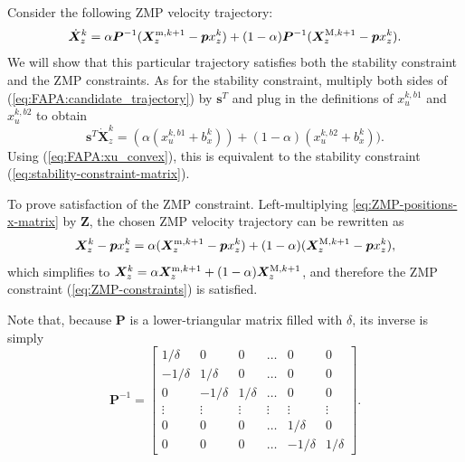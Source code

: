Consider the following ZMP velocity trajectory:
\begin{equation}\label{eq:FAPA:candidate_trajectory}
\dot{\bm{X}}_z^k = \alpha \bm{P}^{-1}(\bm{X}_z^{{\rm m}, k+1} - \bm{p} x_z^k) + (1-\alpha)\bm{P}^{-1}(\bm{X}_z^{{\rm M}, k+1} - \bm{p} x_z^k).
\end{equation}
We will show that this particular trajectory satisfies both the stability
constraint and the ZMP constraints. As for the stability constraint, multiply
both sides of (\ref{eq:FAPA:candidate_trajectory}) by $\bm{s}^T$
and plug in the definitions of $x_u^{k,b1}$ and $x_u^{k,b2}$ to obtain
\begin{equation*}
\bm{s}^T\dot{\bm X}_z^k = (\alpha (x_u^{k,b1} + b^k_x)) + (1-\alpha)(x_u^{k,b2} + b^k_x)).
\end{equation*}
Using (\ref{eq:FAPA:xu_convex}), this is equivalent to the stability
constraint (\ref{eq:stability-constraint-matrix}).

To prove satisfaction of the ZMP constraint. Left-multiplying
\eqref{eq:ZMP-positions-x-matrix} by $\bm{Z}$, the chosen ZMP velocity
trajectory can be rewritten as
\begin{equation*}
\bm{X}_z^k - \bm{p} x_z^k = \alpha (\bm{X}_z^{{\rm m}, k+1} - \bm{p} x_z^k) + (1-\alpha)(\bm{X}_z^{{\rm M}, k+1} - \bm{p} x_z^k),
\end{equation*}
which simplifies to
$\bm{X}_z^k = \alpha \bm{X}_z^{{\rm m}, k+1} + (1-\alpha)\bm{X}_z^{{\rm M}, k+1}$,
and therefore the ZMP constraint (\ref{eq:ZMP-constraints}) is satisfied.
\hfill\bull

Note that, because $\bm{P}$ is a lower-triangular matrix filled with $\delta$,
its inverse is simply
\begin{equation*}
    \bm{P}^{-1}
    =
    \begin{bmatrix}
         1/\delta &         0 &        0 &  \dots &         0 &        0 \\
        -1/\delta &  1/\delta &        0 &  \dots &         0 &        0 \\
                0 & -1/\delta & 1/\delta &  \dots &         0 &        0 \\
           \vdots &    \vdots &   \vdots & \vdots &    \vdots &   \vdots \\
                0 &         0 &        0 &  \dots &  1/\delta &        0 \\
                0 &         0 &        0 &  \dots & -1/\delta & 1/\delta
    \end{bmatrix}.
\end{equation*}
